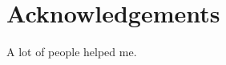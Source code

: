 \clearpage
\thispagestyle{plain}
\par\vspace*{.35\textheight}{\centering Dedicated to my parents\par}
\chapter*{Acknowledgements}
A lot of people helped me.